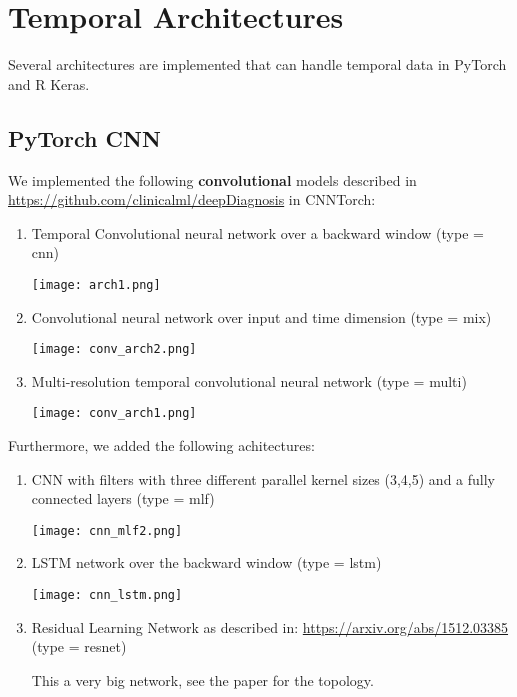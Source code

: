 \documentclass[
]{article}
\begin{document}
\hypertarget{temporal-architectures}{%
\section{Temporal Architectures}\label{temporal-architectures}}

Several architectures are implemented that can handle temporal data in
PyTorch and R Keras.

\hypertarget{pytorch-cnn}{%
\subsection{PyTorch CNN}\label{pytorch-cnn}}

We implemented the following \textbf{convolutional} models described in
\url{https://github.com/clinicalml/deepDiagnosis} in CNNTorch:

\begin{enumerate}
\def\labelenumi{\arabic{enumi})}
\item
  Temporal Convolutional neural network over a backward window (type =
  cnn)

  \texttt{[image: arch1.png]}
\item
  Convolutional neural network over input and time dimension (type =
  mix)

  \texttt{[image: conv\_arch2.png]}
\item
  Multi-resolution temporal convolutional neural network (type = multi)

  \texttt{[image: conv\_arch1.png]}
\end{enumerate}

Furthermore, we added the following achitectures:

\begin{enumerate}
\def\labelenumi{\arabic{enumi})}
\setcounter{enumi}{3}
\item
  CNN with filters with three different parallel kernel sizes (3,4,5)
  and a fully connected layers (type = mlf)

  \texttt{[image: cnn\_mlf2.png]}
\item
  LSTM network over the backward window (type = lstm)

  \texttt{[image: cnn\_lstm.png]}
\item
  Residual Learning Network as described in:
  \url{https://arxiv.org/abs/1512.03385} (type = resnet)

  This a very big network, see the paper for the topology.
\end{enumerate}
\end{document}
